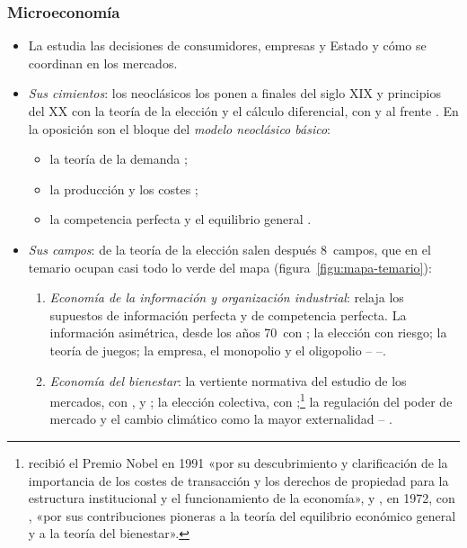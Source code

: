 \documentclass[11pt]{article}
\begin{document}
\subsubsection{Microeconomía}\label{sec:micro}

\begin{itemize}
\item La  estudia las decisiones de consumidores, empresas y Estado y cómo se coordinan en los mercados.
\item \emph{Sus cimientos}: los neoclásicos los ponen a finales del siglo XIX y principios del XX con la teoría de la elección y el cálculo diferencial, con  y  al frente . En la oposición son el bloque del \emph{modelo neoclásico básico}:
  \begin{itemize}
  \item la teoría de la demanda  ;
  \item la producción y los costes  ;
  \item la competencia perfecta y el equilibrio general  .
  \end{itemize}
\item \emph{Sus campos}: de la teoría de la elección salen después 8~campos, que en el temario ocupan casi todo lo verde del mapa (figura~\ref{figu:mapa-temario}):
  \begin{enumerate}
  \item \emph{Economía de la información y organización industrial}: relaja los supuestos de información perfecta y de competencia perfecta. La información asimétrica, desde los años 70~con \textcite{Akerlof1970Market}; la elección con riesgo; la teoría de juegos; la empresa, el monopolio y el oligopolio  -- --.
  \item \emph{Economía del bienestar}: la vertiente normativa del estudio de los mercados, con ,  y ; la elección colectiva, con ;\footnote{ recibió el Premio Nobel en 1991 «por su descubrimiento y clarificación de la importancia de los costes de transacción y los derechos de propiedad para la estructura institucional y el funcionamiento de la economía»\nocite{Nobel1991Coase}, y , en 1972, con , «por sus contribuciones pioneras a la teoría del equilibrio económico general y a la teoría del bienestar»\nocite{Nobel1972HicksArrow}.} la regulación del poder de mercado y el cambio climático como la mayor externalidad  -- .

\end{enumerate}
\end{itemize}
\end{document}
